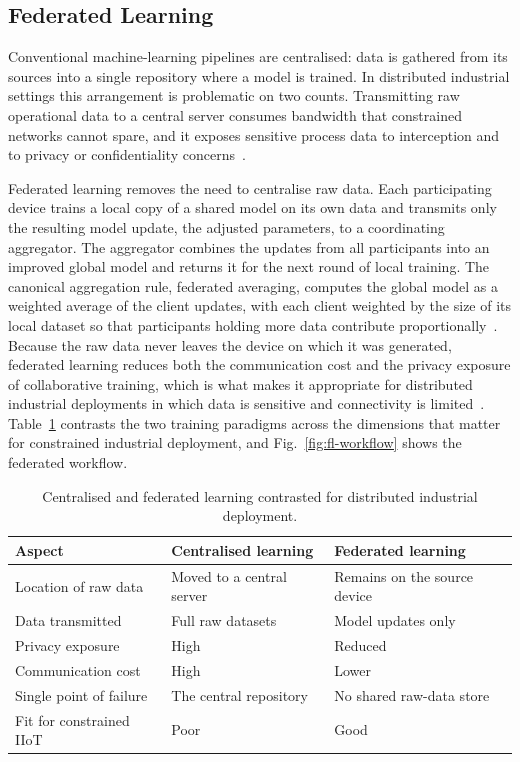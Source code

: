\subsection{Federated Learning}
\label{subsec:bg-fl}

Conventional machine-learning pipelines are centralised: data is gathered from
its sources into a single repository where a model is trained. In distributed
industrial settings this arrangement is problematic on two counts. Transmitting
raw operational data to a central server consumes bandwidth that constrained
networks cannot spare, and it exposes sensitive process data to interception and
to privacy or confidentiality
concerns~\cite{lu2024federated, dritsas2025federated}.

Federated learning removes the need to centralise raw data. Each participating
device trains a local copy of a shared model on its own data and transmits only
the resulting model update, the adjusted parameters, to a coordinating
aggregator. The aggregator combines the updates from all participants into an
improved global model and returns it for the next round of local training. The
canonical aggregation rule, federated averaging, computes the global model as a
weighted average of the client updates, with each client weighted by the size of
its local dataset so that participants holding more data contribute
proportionally~\cite{amadi2026lightweight}. Because the raw data never leaves the
device on which it was generated, federated learning reduces both the
communication cost and the privacy exposure of collaborative training, which is
what makes it appropriate for distributed industrial deployments in which data is
sensitive and connectivity is limited~\cite{ali2024blockchain}.
Table~\ref{tab:central-vs-fl} contrasts the two training paradigms across the
dimensions that matter for constrained industrial deployment, and
Fig.~\ref{fig:fl-workflow} shows the federated workflow.

\begin{table}[!htbp]
\centering
\caption{Centralised and federated learning contrasted for distributed
industrial deployment.}
\label{tab:central-vs-fl}
\small
\renewcommand{\arraystretch}{1.3}
\begin{tabular}{@{}l l l@{}}
\toprule
\textbf{Aspect} & \textbf{Centralised learning} & \textbf{Federated learning} \\
\midrule
Location of raw data     & Moved to a central server   & Remains on the source device \\
Data transmitted         & Full raw datasets           & Model updates only \\
Privacy exposure         & High                        & Reduced \\
Communication cost       & High                        & Lower \\
Single point of failure  & The central repository      & No shared raw-data store \\
Fit for constrained IIoT & Poor                        & Good \\
\bottomrule
\end{tabular}
\end{table}

